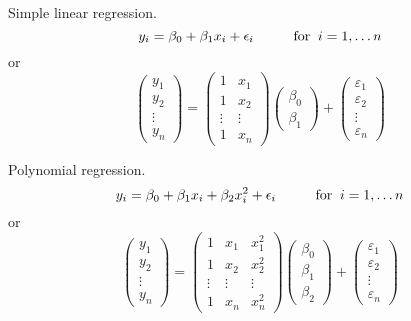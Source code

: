 


\bexa
Simple linear regression.
$$
y_i = \beta_0 + \beta_1 x_i + \epsilon_i  \hskip1cm {\mbox{for}} \; \;  i = 1,\ldots n
$$
or
$$
\left( \begin{array}{c} y_1 \\ y_2 \\ \vdots \\ y_n \end{array} \right) =
\left( \begin{array}{cc}
1 & x_1 \\ 
1 & x_2 \\ 
\vdots & \vdots \\ 
1 & x_n
\end{array} \right)
\left( \begin{array}{c} \beta_0 \\ \beta_1 \end{array} \right) +
\left( \begin{array}{c} \varepsilon_1 \\ \varepsilon_2 \\ \vdots \\ 
	\varepsilon_n \end{array} \right) 
$$
\esexa

\bexa
Polynomial regression.
$$
y_i = \beta_0 + \beta_1 x_i + \beta_2 x_i^2 + \epsilon_i  \hskip1cm {\mbox{for}} \; \;  i = 1,\ldots n
$$
or
$$
\left( \begin{array}{c} y_1 \\ y_2 \\ \vdots \\ y_n \end{array} \right) =
\left( \begin{array}{ccc}
1 & x_1 & x_1^2\\ 
1 & x_2 & x_2^2\\ 
\vdots & \vdots & \vdots\\ 
1 & x_n & x_n^2
\end{array} \right)
\left( \begin{array}{c} \beta_0 \\ \beta_1 \\ \beta_2 \end{array} \right) +
\left( \begin{array}{c} \varepsilon_1 \\ \varepsilon_2 \\ \vdots \\ 
	\varepsilon_n \end{array} \right) 
$$
\esexa

